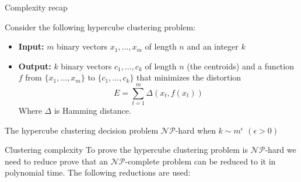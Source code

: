 \documentclass{beamer}
\begin{document}
\begin{frame}{Complexity recap}
    \begin{theorem}
        Consider the following hypercube clustering problem:
        \begin{itemize}
            \item \textbf{Input:} $m$ binary vectors $x_1, \dots, x_m$ of length $n$ and an integer $k$
            \item \textbf{Output:} $k$ binary vectors $c_1, \dots, c_k$ of length $n$ (the centroids) and a function $f$ from $\{x_1, \dots, x_m\}$ to $\{c_1, \dots, c_k\}$ that minimizes the distortion 
            \[
                E = \sum_{t=1}^m \Delta(x_t, f(x_t))    
            \]
            Where $\Delta$ is Hamming distance.
        \end{itemize}
        The hypercube clustering decision problem $\mathcal{NP}$-hard when $k \sim m^\epsilon$ $(\epsilon > 0)$
    \end{theorem}
\end{frame}



\begin{frame}{Clustering complexity}
To prove the hypercube clustering problem is $\mathcal{NP}$-hard we need to reduce prove that an $\mathcal{NP}$-complete problem can be reduced to it in polynomial time. The following reductions are used:
\begin{center}
\end{center}
\end{frame}
\end{document}
